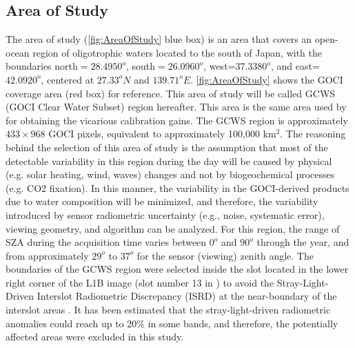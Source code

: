 \documentclass[remotesensing,article,submit,moreauthors,pdftex,10pt,a4paper]{Definitions/mdpi}
\begin{document}
\subsection{Area of Study}
The area of study (\autoref{fig:AreaOfStudy} blue box) is an area that covers an open-ocean region of oligotrophic waters located to the south of Japan, with the boundaries north$=28.4950^o$, south$=26.0960^o$, west=$ 37.3380^o$, and east=$ 42.0920^o$, centered at $27.33^oN$ and $139.71^oE$. \autoref{fig:AreaOfStudy} shows the GOCI coverage area (red box) for reference. This area of study will be called GCWS (GOCI Clear Water Subset) region hereafter. This area is the same area used by \cite{Concha_2018a} for obtaining the vicarious calibration gains. The GCWS region is approximately $433\times968$ GOCI pixels, equivalent to approximately 100,000 km$^2$. The reasoning behind the selection of this area of study is the assumption that most of the detectable variability in this region during the day will be caused by physical (e.g. solar heating, wind, waves) changes and not by biogeochemical processes (e.g. CO2 fixation). In this manner, the variability in the GOCI-derived products due to water composition will be minimized, and therefore, the variability introduced by sensor radiometric uncertainty (e.g., noise, systematic error), viewing geometry, and algorithm can be analyzed. For this region, the range of SZA during the acquisition time varies between $0^o$ and $90^o$ through the year, and from approximately $29^o$ to $37^o$ for the sensor (viewing) zenith angle. The boundaries of the GCWS region were selected inside the slot located in the lower right corner of the L1B image (slot number 13 in \cite{Kim:2015}) to avoid the Stray-Light-Driven Interslot Radiometric Discrepancy (ISRD) at the near-boundary of the interslot areas \cite{Kim:2015,Kim:2016}. It has been estimated that the stray-light-driven radiometric anomalies could reach up to 20\% in some bands, and therefore, the potentially affected areas were excluded in this study. 
\end{document}
